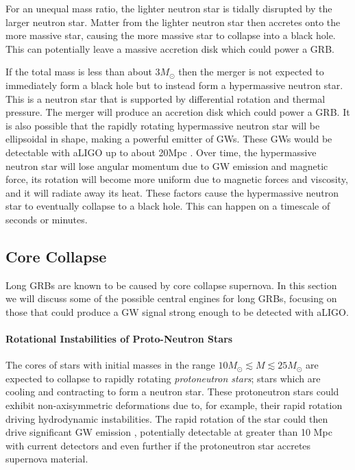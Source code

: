 \documentclass[11pt]{cuthesis}
\begin{document}
For an unequal mass ratio, the lighter neutron star is tidally disrupted by the larger neutron star. Matter from the lighter neutron star then accretes onto the more massive star, causing the more massive star to collapse into a black hole. This can potentially leave a massive accretion disk which could power a GRB.  

If the total mass is less than about 3$M_\odot$ \cite{gw_grb_paradigm} then the merger is not expected to immediately form a black hole but to instead form a hypermassive neutron star. This is a neutron star that is supported by differential rotation and thermal pressure. The merger will produce an accretion disk which could power a GRB. It is also possible that the rapidly rotating hypermassive neutron star will be ellipsoidal in shape, making a powerful emitter of GWs. These GWs would be detectable with aLIGO up to about 20Mpc \cite{gw_grb_paradigm}. Over time, the hypermassive neutron star will lose angular momentum due to GW emission and magnetic force, its rotation will become more uniform due to magnetic forces and viscosity, and it will radiate away its heat. These factors cause the hypermassive neutron star to eventually collapse to a black hole. This can happen on a timescale of seconds or minutes. \cite{Baiotti_2017,Faber2012}

\subsection{Core Collapse}
Long GRBs are known to be caused by core collapse supernova. In this section we will discuss some of the possible central engines for long GRBs, focusing on those that could produce a GW signal strong enough to be detected with aLIGO. 

\paragraph{Rotational Instabilities of Proto-Neutron Stars} 
The cores of stars with initial masses in the range $10M_\odot \lesssim M \lesssim 25M_\odot$ are expected to collapse to rapidly rotating \textit{protoneutron stars}; stars which are cooling and contracting to form a neutron star. \cite{gw_grb_paradigm} These protoneutron stars could exhibit non-axisymmetric deformations due to, for example, their rapid rotation driving hydrodynamic instabilities.  The rapid rotation of the star could then drive significant GW emission \cite{Stergioulas2003}, potentially detectable at greater than 10 Mpc with current detectors and even further if the protoneutron star accretes supernova material. \cite{gw_grb_paradigm} 
\end{document}
